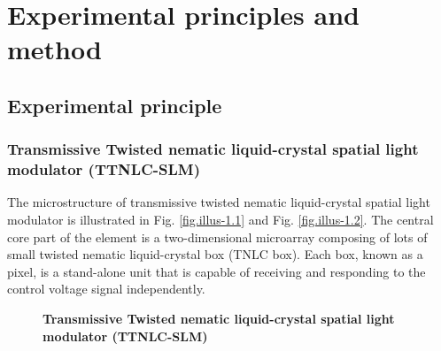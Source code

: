 \documentclass[10pt,a4paper,twocolumn,twoside,UTF8]{article}
\begin{document}
\section{Experimental principles and method}
	\subsection{Experimental principle\autocite{shenGeneralPhysicsLaboratory2015}}
		\subsubsection{Transmissive Twisted nematic liquid-crystal spatial light modulator (TTNLC-SLM)\autocite{nguyenSpatialLightInterference2013}}
		The microstructure of transmissive twisted nematic liquid-crystal spatial light modulator is illustrated in Fig. \ref{fig.illus-1.1} and Fig. \ref{fig.illus-1.2}. 
		The central core part of the element is a two-dimensional microarray composing of lots of small twisted nematic liquid-crystal box (TNLC box). 
		Each box, known as a pixel, is a stand-alone unit that is capable of receiving and responding to the control voltage signal independently. 

		\begin{figure}[htbp]
			\centering		
			\caption{\textbf{Transmissive Twisted nematic liquid-crystal spatial light modulator (TTNLC-SLM)}}
		\end{figure}
\end{document}
